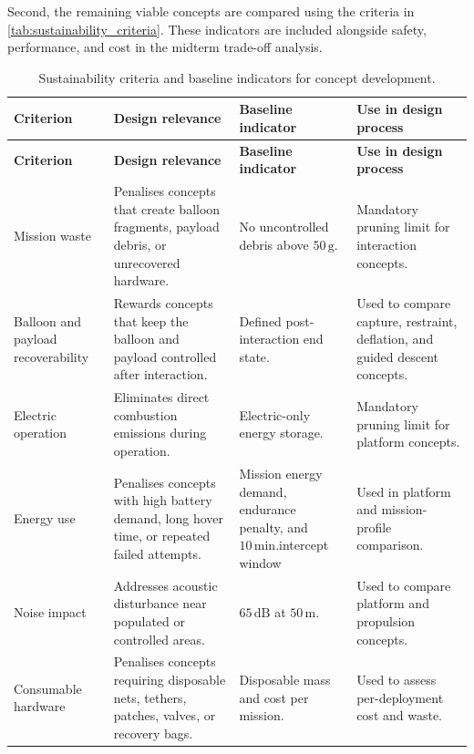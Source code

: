 Second, the remaining viable concepts are compared using the criteria in \autoref{tab:sustainability_criteria}. These indicators are included alongside safety, performance, and cost in the midterm trade-off analysis.

\begin{longtable}{p{} p{} p{} p{}}

\caption{Sustainability criteria and baseline indicators for concept development.}
\label{tab:sustainability_criteria} \\

\hline
\textbf{Criterion} & \textbf{Design relevance} & \textbf{Baseline indicator} & \textbf{Use in design process} \\
\hline
\endfirsthead

\hline
\textbf{Criterion} & \textbf{Design relevance} & \textbf{Baseline indicator} & \textbf{Use in design process} \\
\hline
\endhead
\hline
\endfoot

Mission waste & Penalises concepts that create balloon fragments, payload debris, or unrecovered hardware. & No uncontrolled debris above $50\,\mathrm{g}$. & Mandatory pruning limit for interaction concepts. \\

Balloon and payload recoverability & Rewards concepts that keep the balloon and payload controlled after interaction. & Defined post-interaction end state. & Used to compare capture, restraint, deflation, and guided descent concepts. \\

Electric operation & Eliminates direct combustion emissions during operation. & Electric-only energy storage. & Mandatory pruning limit for platform concepts. \\

Energy use & Penalises concepts with high battery demand, long hover time, or repeated failed attempts. & Mission energy demand, endurance penalty, and $10\,\mathrm{min}$.intercept window & Used in platform and mission-profile comparison. \\

Noise impact & Addresses acoustic disturbance near populated or controlled areas. & $65\,\mathrm{dB}$ at $50\,\mathrm{m}$. & Used to compare platform and propulsion concepts. \\

Consumable hardware & Penalises concepts requiring disposable nets, tethers, patches, valves, or recovery bags. & Disposable mass and cost per mission. & Used to assess per-deployment cost and waste. \\


\end{longtable}
